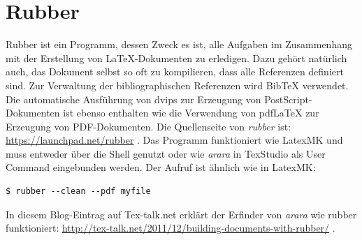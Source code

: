 \section{Rubber}
Rubber ist ein Programm, dessen Zweck es ist, alle Aufgaben im Zusammenhang mit der Erstellung von LaTeX-Dokumenten zu erledigen. Dazu gehört natürlich auch, das Dokument selbst so oft zu kompilieren, dass alle Referenzen definiert sind. Zur Verwaltung der bibliographischen Referenzen wird BibTeX verwendet. Die automatische Ausführung von dvips zur Erzeugung von PostScript-Dokumenten ist ebenso enthalten wie die Verwendung von pdfLaTeX zur Erzeugung von PDF-Dokumenten. Die Quellenseite von \emph{rubber} ist: \url{https://launchpad.net/rubber} . Das Programm funktioniert wie LatexMK und muss entweder über die Shell genutzt oder wie \emph{arara} in TexStudio als User Command eingebunden werden. Der Aufruf ist ähnlich wie in LatexMK: 

\begin{lstlisting}[style=Bash]
$ rubber --clean --pdf myfile
\end{lstlisting}

In diesem Blog-Eintrag auf Tex-talk.net erklärt der Erfinder von \emph{arara} wie rubber funktioniert: \url{http://tex-talk.net/2011/12/building-documents-with-rubber/} .
